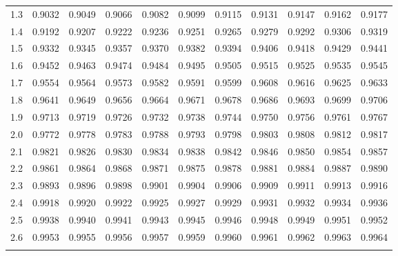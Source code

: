 \begin{tabular}{l|llllllllll}
1.3 & 0.9032 & 0.9049 & 0.9066 & 0.9082 & 0.9099 & 0.9115 & 0.9131 & 0.9147 & 0.9162 & 0.9177 \\\arrayrulecolor{light-gray}\hline\arrayrulecolor{black} 
1.4 & 0.9192 & 0.9207 & 0.9222 & 0.9236 & 0.9251 & 0.9265 & 0.9279 & 0.9292 & 0.9306 & 0.9319 \\\arrayrulecolor{light-gray}\hline\arrayrulecolor{black} 
1.5 & 0.9332 & 0.9345 & 0.9357 & 0.9370 & 0.9382 & 0.9394 & 0.9406 & 0.9418 & 0.9429 & 0.9441 \\\arrayrulecolor{light-gray}\hline\arrayrulecolor{black} 
1.6 & 0.9452 & 0.9463 & 0.9474 & 0.9484 & 0.9495 & 0.9505 & 0.9515 & 0.9525 & 0.9535 & 0.9545 \\\arrayrulecolor{light-gray}\hline\arrayrulecolor{black} 
1.7 & 0.9554 & 0.9564 & 0.9573 & 0.9582 & 0.9591 & 0.9599 & 0.9608 & 0.9616 & 0.9625 & 0.9633 \\\arrayrulecolor{light-gray}\hline\arrayrulecolor{black} 
1.8 & 0.9641 & 0.9649 & 0.9656 & 0.9664 & 0.9671 & 0.9678 & 0.9686 & 0.9693 & 0.9699 & 0.9706 \\\arrayrulecolor{light-gray}\hline\arrayrulecolor{black} 
1.9 & 0.9713 & 0.9719 & 0.9726 & 0.9732 & 0.9738 & 0.9744 & 0.9750 & 0.9756 & 0.9761 & 0.9767 \\\arrayrulecolor{light-gray}\hline\arrayrulecolor{black} 
2.0 & 0.9772 & 0.9778 & 0.9783 & 0.9788 & 0.9793 & 0.9798 & 0.9803 & 0.9808 & 0.9812 & 0.9817 \\\arrayrulecolor{light-gray}\hline\arrayrulecolor{black} 
2.1 & 0.9821 & 0.9826 & 0.9830 & 0.9834 & 0.9838 & 0.9842 & 0.9846 & 0.9850 & 0.9854 & 0.9857 \\\arrayrulecolor{light-gray}\hline\arrayrulecolor{black} 
2.2 & 0.9861 & 0.9864 & 0.9868 & 0.9871 & 0.9875 & 0.9878 & 0.9881 & 0.9884 & 0.9887 & 0.9890 \\\arrayrulecolor{light-gray}\hline\arrayrulecolor{black} 
2.3 & 0.9893 & 0.9896 & 0.9898 & 0.9901 & 0.9904 & 0.9906 & 0.9909 & 0.9911 & 0.9913 & 0.9916 \\\arrayrulecolor{light-gray}\hline\arrayrulecolor{black} 
2.4 & 0.9918 & 0.9920 & 0.9922 & 0.9925 & 0.9927 & 0.9929 & 0.9931 & 0.9932 & 0.9934 & 0.9936 \\\arrayrulecolor{light-gray}\hline\arrayrulecolor{black} 
2.5 & 0.9938 & 0.9940 & 0.9941 & 0.9943 & 0.9945 & 0.9946 & 0.9948 & 0.9949 & 0.9951 & 0.9952 \\\arrayrulecolor{light-gray}\hline\arrayrulecolor{black} 
2.6 & 0.9953 & 0.9955 & 0.9956 & 0.9957 & 0.9959 & 0.9960 & 0.9961 & 0.9962 & 0.9963 & 0.9964 \\\arrayrulecolor{light-gray}\hline\arrayrulecolor{black} 

\end{tabular}
